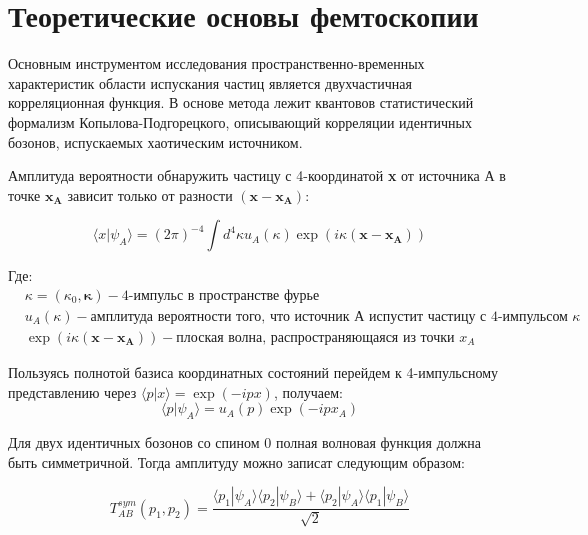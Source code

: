 \documentclass[a4paper]{extarticle}
\begin{document}
\section{Теоретические основы фемтоскопии}
    Основным инструментом исследования пространственно-временных характеристик 
    области испускания частиц является двухчастичная корреляционная функция. 
    В основе метода лежит квантовов статистический формализм Копылова-Подгорецкого, 
    описывающий корреляции идентичных бозонов, испускаемых хаотическим источником.

    Амплитуда вероятности обнаружить частицу с 4-координатой \textbf{x} от источника А 
    в точке $\mathbf{x_{A}}$ зависит только от разности $(\mathbf{x} - \mathbf{x_{A}})$:

    \begin{equation}
        \langle x|\psi_{A}\rangle =
            (2\pi)^{-4} 
            \int 
                d^4\kappa u_{A}(\kappa) 
                \exp(i\kappa(\mathbf{x} - \mathbf{x_{A}})) 
    \end{equation}

    Где:
    \begin{align*}
        &\kappa = (\kappa_0, \mathbf{\kappa}) 
            - \text{4-импульс в пространстве фурье} \\
        &u_{A}(\kappa) 
            - \text{амплитуда вероятности того, что источник А испустит частицу с 4-импульсом }\kappa \\
        &\exp(i\kappa(\mathbf{x} - \mathbf{x_{A}})) 
            - \text{плоская волна, распространяющаяся из точки } x_A
    \end{align*}

    Пользуясь полнотой базиса координатных состояний перейдем 
    к 4-импульсному представлению через $\langle p|x\rangle = \exp(-ipx)$, получаем:
    \begin{equation}
        \langle p | \psi_{A}\rangle = 
            u_{A}(p) \exp(-ipx_{A})
    \end{equation}

    Для двух идентичных бозонов со спином 0 
    полная волновая функция должна быть симметричной. 
    Тогда амплитуду можно записат следующим образом:

    \begin{equation}
        T^{sym}_{AB} (p_{1}, p_{2}) = 
        \frac{
            \langle p_{1} | \psi_{A}\rangle
            \langle p_{2} | \psi_{B}\rangle + 
            \langle p_{2} | \psi_{A}\rangle 
            \langle p_{1} | \psi_{B}\rangle
        }{ 
            \sqrt{2}
        }
    \end{equation}
\end{document}
